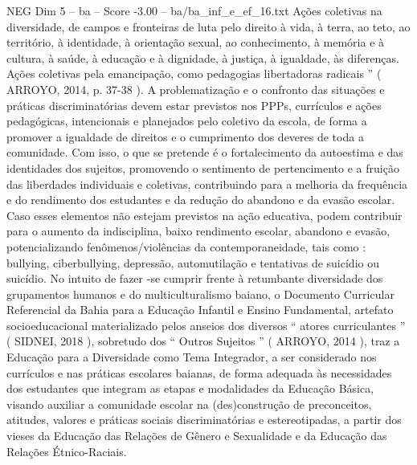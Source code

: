 \begin{textsample}{NEG Dim 5 – ba – Score -3.00 – ba/ba\_inf\_e\_ef\_16.txt}
Ações coletivas na diversidade, de campos e fronteiras de luta pelo direito à vida, à terra, ao teto, ao território, à identidade, à orientação sexual, ao conhecimento, à memória e à cultura, à saúde, à educação e à dignidade, à justiça, à igualdade, às diferenças.
Ações coletivas pela emancipação, como pedagogias libertadoras radicais ” ( ARROYO, 2014, p. 37-38 ).
A problematização e o confronto das situações e práticas discriminatórias devem estar previstos nos PPPs, currículos e ações pedagógicas, intencionais e planejados pelo coletivo da escola, de forma a promover a igualdade de direitos e o cumprimento dos deveres de toda a comunidade.
Com isso, o que se pretende é o fortalecimento da autoestima e das identidades dos sujeitos, promovendo o sentimento de pertencimento e a fruição das liberdades individuais e coletivas, contribuindo para a melhoria da frequência e do rendimento dos estudantes e da redução do abandono e da evasão escolar.
Caso esses elementos não estejam previstos na ação educativa, podem contribuir para o aumento da indisciplina, baixo rendimento escolar, abandono e evasão, potencializando fenômenos/violências da contemporaneidade, tais como : bullying, ciberbullying, depressão, automutilação e tentativas de suicídio ou suicídio.
No intuito de fazer -se cumprir frente à retumbante diversidade dos grupamentos humanos e do multiculturalismo baiano, o Documento Curricular Referencial da Bahia para a Educação Infantil e Ensino Fundamental, artefato socioeducacional materializado pelos anseios dos diversos “ atores curriculantes ” ( SIDNEI, 2018 ), sobretudo dos “ Outros Sujeitos ” ( ARROYO, 2014 ), traz a Educação para a Diversidade como Tema Integrador, a ser considerado nos currículos e nas práticas escolares baianas, de forma adequada às necessidades dos estudantes que integram as etapas e modalidades da Educação Básica, visando auxiliar a comunidade escolar na (des)construção de preconceitos, atitudes, valores e práticas sociais discriminatórias e estereotipadas, a partir dos vieses da Educação das Relações de Gênero e Sexualidade e da Educação das Relações Étnico-Raciais.

\end{textsample}
